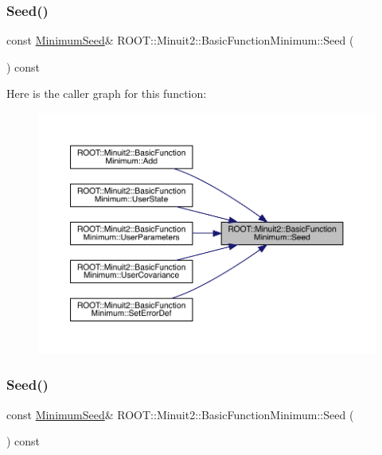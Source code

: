 \subsubsection{\texorpdfstring{Seed()}{Seed()}\hspace{0.1cm}{\footnotesize\ttfamily [1/3]}}
{\footnotesize\ttfamily const \mbox{\hyperlink{classROOT_1_1Minuit2_1_1MinimumSeed}{Minimum\+Seed}}\& R\+O\+O\+T\+::\+Minuit2\+::\+Basic\+Function\+Minimum\+::\+Seed (\begin{DoxyParamCaption}{ }\end{DoxyParamCaption}) const\hspace{0.3cm}{\ttfamily [inline]}}

Here is the caller graph for this function\+:
\nopagebreak
\begin{figure}[H]
\begin{center}
\leavevmode
\includegraphics[width=350pt]{de/d25/classROOT_1_1Minuit2_1_1BasicFunctionMinimum_a925aba07b861d7b3d1e5386411a5ea2f_icgraph}
\end{center}
\end{figure}
\mbox{\label{classROOT_1_1Minuit2_1_1BasicFunctionMinimum_a925aba07b861d7b3d1e5386411a5ea2f}} 
\subsubsection{\texorpdfstring{Seed()}{Seed()}\hspace{0.1cm}{\footnotesize\ttfamily [2/3]}}
{\footnotesize\ttfamily const \mbox{\hyperlink{classROOT_1_1Minuit2_1_1MinimumSeed}{Minimum\+Seed}}\& R\+O\+O\+T\+::\+Minuit2\+::\+Basic\+Function\+Minimum\+::\+Seed (\begin{DoxyParamCaption}{ }\end{DoxyParamCaption}) const\hspace{0.3cm}{\ttfamily [inline]}}

